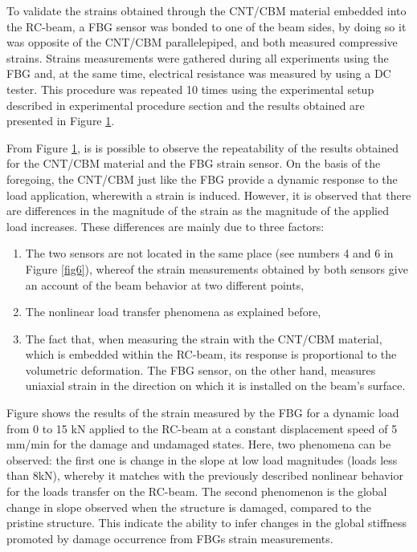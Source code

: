 \documentclass[twocolumn]{bmcart}%
\begin{document}
To validate the strains obtained through the CNT/CBM material embedded into the RC-beam, a FBG sensor was bonded to one of the beam sides, by doing so it was opposite of the CNT/CBM parallelepiped, and both measured compressive strains. Strains measurements were gathered during all experiments using the FBG and, at the same time, electrical resistance was measured by using a DC tester. This procedure was repeated 10 times using the experimental setup described in experimental procedure section and the results obtained are presented in Figure \ref{fig12}.

From Figure \ref{fig12}, is is possible to observe the repeatability of the results obtained for the CNT/CBM material and the FBG strain sensor. On the basis of the foregoing, the CNT/CBM just like the FBG provide a dynamic response to the load application, wherewith a strain is induced. However, it is observed that there are differences in the magnitude of the strain as the magnitude of the applied load increases. These differences are mainly due to three factors: 

\begin{enumerate}

 \item  The two sensors are not located in the same place (see numbers 4 and 6 in Figure \ref{fig6}), whereof the strain measurements obtained by both sensors give an account of the beam behavior at two different points,

 \item  The nonlinear load transfer phenomena as explained before, 

 \item  The fact that, when measuring the strain with the CNT/CBM material, which is embedded within the RC-beam, its response is proportional to the volumetric deformation. The FBG sensor, on the other hand, measures uniaxial strain in the direction on which it is installed on the beam’s surface.

\end{enumerate}

\begin{figure}[h!]
  \caption{
      }
      \label{fig12}
      \end{figure}



Figure  shows the results of the strain measured by the FBG for a dynamic load from 0 to 15 kN applied to the RC-beam at a constant displacement speed of 5 mm/min for the damage and undamaged states. Here, two phenomena can be observed: the first one is change in the slope at low load magnitudes (loads less than 8kN), whereby it matches with the previously described nonlinear behavior for the loads transfer on the RC-beam. The second phenomenon is the global change in slope observed when the structure is damaged, compared to the pristine structure. This indicate the ability to infer changes in the global stiffness promoted by damage occurrence from FBGs strain measurements.
\end{document}
